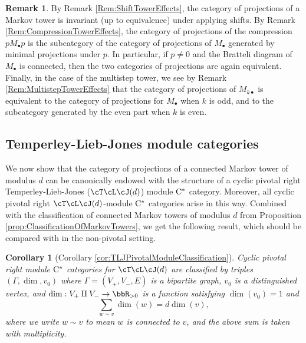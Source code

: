 \documentclass[11pt]{article}
\theoremstyle{plain}
\newtheorem*{cor*}{Corollary}
\theoremstyle{definition}
\newtheorem{rem}[thm]{Remark}
\newcommand{\Cstar}{\rm{C^*}}
\begin{document}
\begin{rem}
By Remark \ref{Rem:ShiftTowerEffects}, the category of projections of a Markov tower is invariant (up to equivalence) under applying shifts. By Remark \ref{Rem:CompressionTowerEffects}, the category of projections of the compression $pM_\bullet p$ is the subcategory of the category of projections of $M_\bullet$ generated by minimal projections under $p$. In particular, if $p\neq 0$ and the Bratteli diagram of $M_\bullet$ is connected, then the two categories of projections are again equivalent. Finally, in the case of the multistep tower, we see by Remark \ref{Rem:MultistepTowerEffects} that the category of projections of $M_{k\bullet}$ is equivalent to the category of projections for $M_\bullet$ when $k$ is odd, and to the subcategory generated by the even part when $k$ is even.
\end{rem}

\subsection{Temperley-Lieb-Jones module categories} 
\label{sec:TLJmodules}

We now show that the category of projections of a connected Markov tower of modulus $d$ can be canonically endowed with the structure of a cyclic pivotal right Temperley-Lieb-Jones ($\cT\cL\cJ(d)$) module $\Cstar$ category.
Moreover, all cyclic pivotal right $\cT\cL\cJ(d)$-module $\Cstar$ categories arise in this way.
Combined with the classification of connected Markov towers of modulus $d$ from Proposition \ref{prop:ClassificationOfMarkovTowers}, we get the following result, which should be compared with \cite{MR3420332} in the non-pivotal setting.

\begin{cor*}[Corollary \ref{cor:TLJPivotalModuleClassification}]
Cyclic pivotal right module $\Cstar$ categories for $\cT\cL\cJ(d)$ are classified by triples $(\Gamma, \dim, v_0)$ where $\Gamma=(V_+, V_- , E)$ is a bipartite graph, $v_0$ is a distinguished vertex, and $\dim : V_+\amalg V_- \to \bbR_{>0}$ is a function satisfying $\dim(v_0) = 1$ and
$$
\sum_{w\sim v} \dim(w) = d \dim(v),
$$
where we write $w\sim v$ to mean $w$ is connected to $v$, and the above sum is taken with multiplicity.
\end{cor*}
\end{document}
